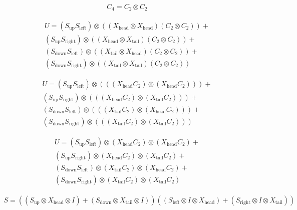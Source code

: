 \begin{align}
  C_4 = C_2 \otimes C_2
\end{align}

\begin{align}
  U =
  (S_{\text{up}}  S_{\text{left}}) \otimes ((X_{\text{head}} \otimes X_{\text{head}}) (C_2 \otimes C_2)) +   \\
  (S_{\text{up}}  S_{\text{right}}) \otimes ((X_{\text{head}} \otimes X_{\text{tail}}) (C_2 \otimes C_2)) +  \\
  (S_{\text{down}}  S_{\text{left}}) \otimes ((X_{\text{tail}} \otimes X_{\text{head}}) (C_2 \otimes C_2)) + \\
  (S_{\text{down}}  S_{\text{right}}) \otimes ((X_{\text{tail}} \otimes X_{\text{tail}}) (C_2 \otimes C_2))
\end{align}


\begin{align}
  U =
  (S_{\text{up}}  S_{\text{left}}) \otimes (((X_{\text{head}}C_2) \otimes (X_{\text{head}}C_2))) +   \\
  (S_{\text{up}}  S_{\text{right}}) \otimes (((X_{\text{head}}C_2) \otimes (X_{\text{tail}}C_2))) +  \\
  (S_{\text{down}}  S_{\text{left}}) \otimes (((X_{\text{tail}}C_2) \otimes (X_{\text{head}}C_2))) + \\
  (S_{\text{down}}  S_{\text{right}}) \otimes (((X_{\text{tail}}C_2) \otimes (X_{\text{tail}}C_2)))
\end{align}



\begin{align}
  U =
  (S_{\text{up}}  S_{\text{left}}) \otimes (X_{\text{head}}C_2) \otimes (X_{\text{head}}C_2) +   \\
  (S_{\text{up}}  S_{\text{right}}) \otimes (X_{\text{head}}C_2) \otimes (X_{\text{tail}}C_2) +  \\
  (S_{\text{down}}  S_{\text{left}}) \otimes (X_{\text{tail}}C_2) \otimes (X_{\text{head}}C_2) + \\
  (S_{\text{down}}  S_{\text{right}}) \otimes (X_{\text{tail}}C_2) \otimes (X_{\text{tail}}C_2)
\end{align}




\begin{align}
  S = ((S_{\text{up}} \otimes  X_{\text{head}} \otimes I) +
  (S_{\text{down}} \otimes X_{\text{tail}} \otimes I))
  ((S_{\text{left}} \otimes I \otimes X_{\text{head}}) +
  (S_{\text{right}} \otimes I \otimes  X_{\text{tail}} ))
\end{align}


